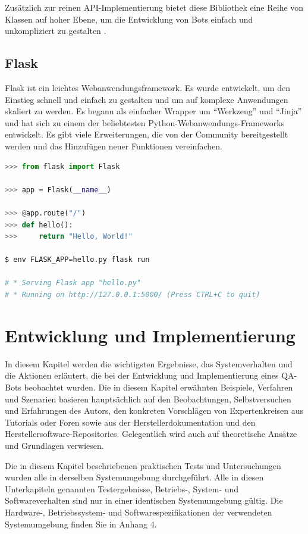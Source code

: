 \documentclass[
        ngerman,
        paper=a4,
        numbers=noendperiod,
]{scrreprt}
\begin{document}
Zusätzlich zur reinen API-Implementierung bietet diese Bibliothek eine Reihe von Klassen auf hoher Ebene, um die Entwicklung von Bots einfach und unkompliziert zu gestalten \citep{Python-telegram-bot/python-telegram-bot:Refuse}.


\section{Flask}
Flask ist ein leichtes Webanwendungsframework. Es wurde entwickelt, um den Einstieg schnell und einfach zu gestalten und um auf komplexe Anwendungen skaliert zu werden. Es begann als einfacher Wrapper um \enquote{Werkzeug} und \enquote{Jinja} und hat sich zu einem der beliebtesten Python-Webanwendungs-Frameworks entwickelt. Es gibt viele Erweiterungen, die von der Community bereitgestellt werden und das Hinzufügen neuer Funktionen vereinfachen.

\begin{lstlisting}[language=Python, caption=Ein einfaches Flask Beispiel]
>>> from flask import Flask

>>> app = Flask(__name__)

>>> @app.route("/")
>>> def hello():
>>>     return "Hello, World!"

$ env FLASK_APP=hello.py flask run

# * Serving Flask app "hello.py"
# * Running on http://127.0.0.1:5000/ (Press CTRL+C to quit)
\end{lstlisting}




\chapter{Entwicklung und Implementierung}
In diesem Kapitel werden die wichtigsten Ergebnisse, das Systemverhalten und die Aktionen erläutert, die bei der Entwicklung und Implementierung eines QA-Bots beobachtet wurden. Die in diesem Kapitel erwähnten Beispiele, Verfahren und Szenarien basieren hauptsächlich auf den Beobachtungen, Selbstversuchen und Erfahrungen des Autors, den konkreten Vorschlägen von Expertenkreisen aus Tutorials oder Foren sowie aus der Herstellerdokumentation und den Herstellersoftware-Repositories. Gelegentlich wird auch auf theoretische Ansätze und Grundlagen verwiesen.

Die in diesem Kapitel beschriebenen praktischen Tests und Untersuchungen wurden alle in derselben Systemumgebung durchgeführt. Alle in diesen Unterkapiteln genannten Testergebnisse, Betriebs-, System- und Softwareverhalten sind nur in einer identischen Systemumgebung gültig. Die Hardware-, Betriebssystem- und Softwarespezifikationen der verwendeten Systemumgebung finden Sie in Anhang 4. %
\end{document}
